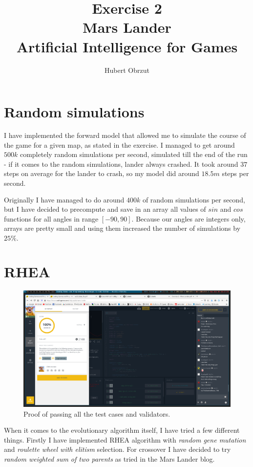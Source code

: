 \documentclass[11pt]{article}
\title{
	Exercise 2 \\
	Mars Lander \\
	Artificial Intelligence for Games \\
}
\author{Hubert Obrzut}
\begin{document}
	\maketitle
	
	\section{Random simulations}
 	I have implemented the forward model that allowed me to simulate the course of the game for a given map, as stated in the exercise. I managed to get around $500k$ completely random simulations per second, simulated till the end of the run - if it comes to the random simulations, lander always crashed. It took around $37$ steps on average for the lander to crash, so my model did around $18.5m$ steps per second.
 	
 	Originally I have managed to do around $400k$ of random simulations per second, but I have decided to precompute and save in an array all values of $sin$ and $cos$ functions for all angles in range $[-90, 90]$. Because our angles are integers only, arrays are pretty small and using them increased the number of simulations by $25\%$.
 	
 	\section{RHEA}
 	
 	\begin{figure}[h]
 	\centering
	\includegraphics[scale=0.35]{screens/mars-lander-episode2} 	
	\caption{Proof of passing all the test cases and validators.}
 	\end{figure}
	
	When it comes to the evolutionary algorithm itself, I have tried a few different things. Firstly I have implemented RHEA algorithm with \textit{random gene mutation} and \textit{roulette wheel with elitism} selection. For crossover I have decided to try \textit{random weighted sum of two parents} as tried in the  Mars Lander blog.
	
\end{document}
